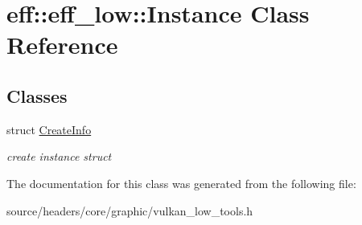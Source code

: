 \hypertarget{classeff_1_1eff__low_1_1Instance}{}\section{eff\+:\+:eff\+\_\+low\+:\+:Instance Class Reference}
\label{classeff_1_1eff__low_1_1Instance}
\subsection*{Classes}
\begin{DoxyCompactItemize}
\item 
struct \mbox{\hyperlink{structeff_1_1eff__low_1_1Instance_1_1CreateInfo}{Create\+Info}}
\begin{DoxyCompactList}\small\item\em create instance struct \end{DoxyCompactList}\end{DoxyCompactItemize}


The documentation for this class was generated from the following file\+:\begin{DoxyCompactItemize}
\item 
source/headers/core/graphic/vulkan\+\_\+low\+\_\+tools.\+h\end{DoxyCompactItemize}
